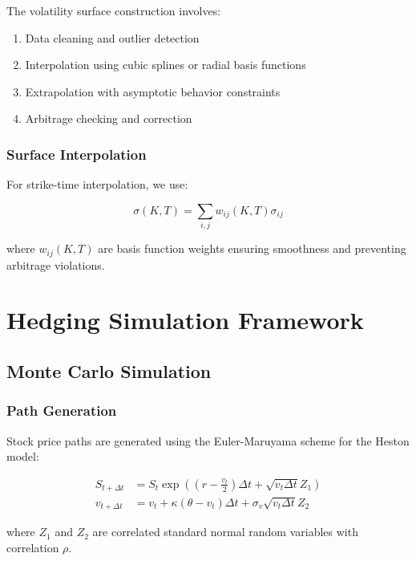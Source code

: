 \documentclass[12pt,a4paper]{article}
\begin{document}
The volatility surface construction involves:

\begin{enumerate}
    \item Data cleaning and outlier detection
    \item Interpolation using cubic splines or radial basis functions
    \item Extrapolation with asymptotic behavior constraints
    \item Arbitrage checking and correction
\end{enumerate}

\subsubsection{Surface Interpolation}

For strike-time interpolation, we use:

\begin{equation}
\sigma(K, T) = \sum_{i,j} w_{ij}(K, T) \sigma_{ij}
\end{equation}

where $w_{ij}(K, T)$ are basis function weights ensuring smoothness and preventing arbitrage violations.

\section{Hedging Simulation Framework}

\subsection{Monte Carlo Simulation}

\subsubsection{Path Generation}

Stock price paths are generated using the Euler-Maruyama scheme for the Heston model:

\begin{align}
S_{t+\Delta t} &= S_t \exp\left(\left(r - \frac{v_t}{2}\right)\Delta t + \sqrt{v_t \Delta t} Z_1\right) \\
v_{t+\Delta t} &= v_t + \kappa(\theta - v_t)\Delta t + \sigma_v\sqrt{v_t \Delta t} Z_2
\end{align}

where $Z_1$ and $Z_2$ are correlated standard normal random variables with correlation $\rho$.
\end{document}
